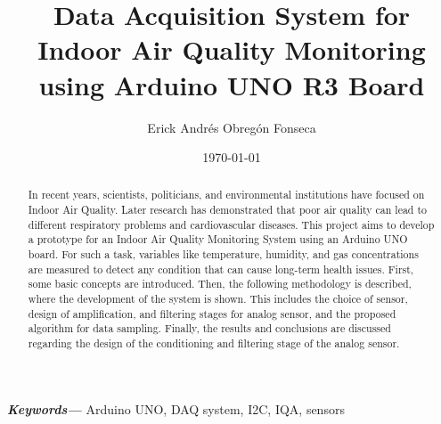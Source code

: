 \documentclass[10pt,a4paper]{article}
\providecommand{\keywords}[1]
{
  \small	
  \textbf{\textit{Keywords---}} #1
}
\begin{document}
\title{Data Acquisition System for Indoor Air Quality Monitoring using Arduino UNO R3 Board}
\author{Erick Andrés Obregón Fonseca}
\date{\today}
\maketitle




\begin{abstract}
\normalsize
In recent years, scientists, politicians, and environmental institutions have focused on Indoor Air Quality. Later research has demonstrated that poor air quality can lead to different respiratory problems and cardiovascular diseases. This project aims to develop a prototype for an Indoor Air Quality Monitoring System using an Arduino UNO board. For such a task, variables like temperature, humidity, and gas concentrations are measured to detect any condition that can cause long-term health issues. First, some basic concepts are introduced. Then, the following methodology is described, where the development of the system is shown. This includes the choice of sensor, design of amplification, and filtering stages for analog sensor, and the proposed algorithm for data sampling. Finally, the results and conclusions are discussed regarding the design of the conditioning and filtering stage of the analog sensor.
\end{abstract}

\keywords{Arduino UNO, DAQ system, I2C, IQA, sensors}

\setcounter{tocdepth}{2}
\tableofcontents


\clearpage






\clearpage

\clearpage
{}
{}

\end{document}
